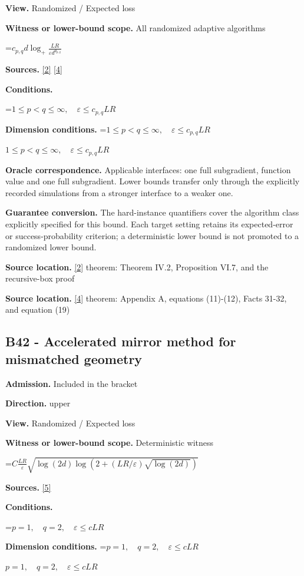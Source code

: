 \documentclass[10pt,a4paper]{article}
\newcommand{\AtlasMath}[1]{\par\begingroup\centering\setbox0=\hbox{$\displaystyle #1$}\ifdim\wd0>1.4\linewidth\typeout{ATLAS WIDE FORMULA: \the\wd0}\fi\ifdim\wd0>\linewidth\resizebox{\linewidth}{!}{\box0}\else\box0\fi\par\endgroup}
\newcommand{\AtlasInlineMath}[1]{\begingroup\setbox0=\hbox{$#1$}\ifdim\wd0>.4\linewidth\endgroup\AtlasMath{#1}\else\endgroup$#1$\fi}
\begin{document}
\textbf{View.} Randomized / Expected loss

\textbf{Witness or lower-bound scope.} All randomized adaptive algorithms

\AtlasMath{c_{p,q}d\log_+\frac{LR}{\varepsilon d^{\theta_{p,q}}}}
\textbf{Sources.} \href{https://arxiv.org/pdf/1407.5144}{[2]} \href{https://arxiv.org/pdf/2609.20687}{[4]}

\textbf{Conditions.} 
\AtlasMath{1\le p<q\le\infty,\quad\varepsilon\le c_{p,q}LR}


\textbf{Dimension conditions.} \AtlasInlineMath{1\le p<q\le\infty,\quad\varepsilon\le c_{p,q}LR}

\textbf{Oracle correspondence.} Applicable interfaces: one full subgradient, function value and one full subgradient. Lower bounds transfer only through the explicitly recorded simulations from a stronger interface to a weaker one.

\textbf{Guarantee conversion.} The hard-instance quantifiers cover the algorithm class explicitly specified for this bound. Each target setting retains its expected-error or success-probability criterion; a deterministic lower bound is not promoted to a randomized lower bound.

\textbf{Source location.} \href{https://arxiv.org/pdf/1407.5144}{[2]} theorem: Theorem IV.2, Proposition VI.7, and the recursive-box proof

\textbf{Source location.} \href{https://arxiv.org/pdf/2609.20687}{[4]} theorem: Appendix A, equations (11)-(12), Facts 31-32, and equation (19)

\subsection{B42 - Accelerated mirror method for mismatched geometry}
\textbf{Admission.} Included in the bracket

\textbf{Direction.} upper

\textbf{View.} Randomized / Expected loss

\textbf{Witness or lower-bound scope.} Deterministic witness

\AtlasMath{C\frac{LR}{\varepsilon}\sqrt{\log(2d)\log(2+(LR/\varepsilon)\sqrt{\log(2d)})}}
\textbf{Sources.} \href{https://arxiv.org/pdf/2609.32910}{[5]}

\textbf{Conditions.} 
\AtlasMath{p=1,\quad q=2,\quad\varepsilon\le cLR}


\textbf{Dimension conditions.} \AtlasInlineMath{p=1,\quad q=2,\quad\varepsilon\le cLR}
\end{document}
